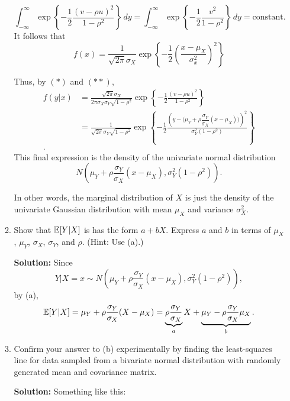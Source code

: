 \documentclass[12pt]{amsart}
\newcommand{\sol}{\bigskip\noindent\textbf{Solution: }}
\begin{document}
\begin{enumerate}
\begin{enumerate}
        \[
            \int_{-\infty}^\infty
            \exp\left\{-\frac12\frac{(v - \rho u)^2}{1-\rho^2}\right\}\,dy
            =\int_{-\infty}^\infty
            \exp\left\{-\frac12\frac{v^2}{1-\rho^2}\right\}\,dy = \text{constant.}
        \]
        It follows that
        \[
            f(x) = \frac1{\sqrt{2\pi}\sigma_X}\exp\left\{-\frac12\left(\frac{x - \mu_X}{\sigma_x^2}\right)^2\right\}
            \tag{$**$}
        \]

        Thus, by $(*)$ and $(**)$,
        \begin{align*}
            f(y|x) &= \frac{\sqrt{2\pi}\sigma_X}{2\pi\sigma_X\sigma_Y\sqrt{1-\rho^2}}
            \exp\left\{-\frac12\frac{(v - \rho u)^2}{1-\rho^2}\right\}\\
            &= \frac1{\sqrt{2\pi}\sigma_Y\sqrt{1-\rho^2}}
            \exp\left\{-\frac12\frac{\left(y - \Big(\mu_Y
            + \rho\dfrac{\sigma_Y}{\sigma_X}(x - \mu_X)\Big)\right)^2}{\sigma_Y^2(1-\rho^2)}\right\}\\.
        \end{align*}
        This final expression is the density of the univariate normal distribution
        \[
            N\left(\mu_Y + \rho\dfrac{\sigma_Y}{\sigma_X}(x - \mu_X), \sigma_Y^2(1-\rho^2)\right).
        \]

        In other words, the marginal distribution of $X$ is just the density of the
        univariate Gaussian distribution with mean $\mu_X$ and variance $\sigma_X^2$.


        \item Show that $\operatorname{\mathbb{E}}[Y|X]$ is has the form $a+bX$.
        Express $a$ and $b$ in terms of $\mu_X$, $\mu_Y$, $\sigma_X$, $\sigma_Y$, and $\rho$.
        (Hint: Use (a).)
        
        \sol
        Since
        \[
            Y|X=x \sim N\left(\mu_Y + \rho\dfrac{\sigma_Y}{\sigma_X}(x - \mu_X), \sigma_Y^2(1-\rho^2)\right),
        \]
        by (a),
        \[
            \operatorname{\mathbb{E}}[Y|X] = \mu_Y + \rho\dfrac{\sigma_Y}{\sigma_X}(X - \mu_X) = \underbrace{\rho\frac{\sigma_Y}{\sigma_X}}_a X + \underbrace{\mu_Y - \rho\frac{\sigma_Y}{\sigma_X}\mu_X}_{b}.
        \]

        \item Confirm your answer to (b) experimentally by finding the least-squares line for data
        sampled from a bivariate normal distribution with randomly generated mean and
        covariance matrix. 

        \sol
        Something like this:


\end{enumerate}
\end{enumerate}
\end{document}
